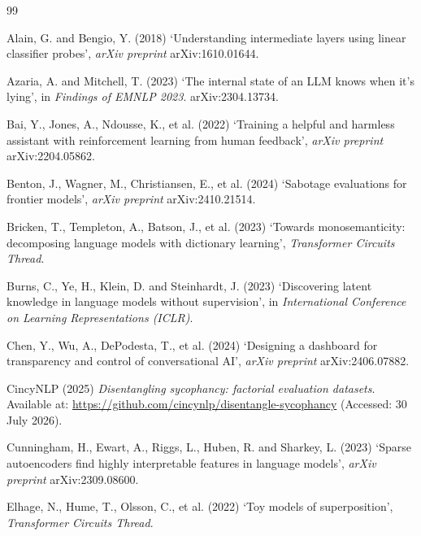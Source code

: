 \documentclass[conference]{IEEEtran}
\begin{document}
\begin{thebibliography}{99}
\setlength{\itemsep}{2pt}

Alain, G. and Bengio, Y. (2018) `Understanding intermediate layers using linear
classifier probes', \textit{arXiv preprint} arXiv:1610.01644.

Azaria, A. and Mitchell, T. (2023) `The internal state of an LLM knows when it's
lying', in \textit{Findings of EMNLP 2023}. arXiv:2304.13734.

Bai, Y., Jones, A., Ndousse, K., et al. (2022) `Training a helpful and harmless
assistant with reinforcement learning from human feedback', \textit{arXiv
preprint} arXiv:2204.05862.

Benton, J., Wagner, M., Christiansen, E., et al. (2024) `Sabotage evaluations
for frontier models', \textit{arXiv preprint} arXiv:2410.21514.

Bricken, T., Templeton, A., Batson, J., et al. (2023) `Towards monosemanticity:
decomposing language models with dictionary learning',
\textit{Transformer Circuits Thread}.

Burns, C., Ye, H., Klein, D. and Steinhardt, J. (2023) `Discovering latent
knowledge in language models without supervision', in \textit{International
Conference on Learning Representations (ICLR)}.

Chen, Y., Wu, A., DePodesta, T., et al. (2024) `Designing a dashboard for
transparency and control of conversational AI', \textit{arXiv preprint}
arXiv:2406.07882.

CincyNLP (2025) \textit{Disentangling sycophancy: factorial evaluation
datasets}. Available at: \url{https://github.com/cincynlp/disentangle-sycophancy}
(Accessed: 30 July 2026).

Cunningham, H., Ewart, A., Riggs, L., Huben, R. and Sharkey, L. (2023) `Sparse
autoencoders find highly interpretable features in language models',
\textit{arXiv preprint} arXiv:2309.08600.

Elhage, N., Hume, T., Olsson, C., et al. (2022) `Toy models of superposition',
\textit{Transformer Circuits Thread}.


\end{thebibliography}
\end{document}

